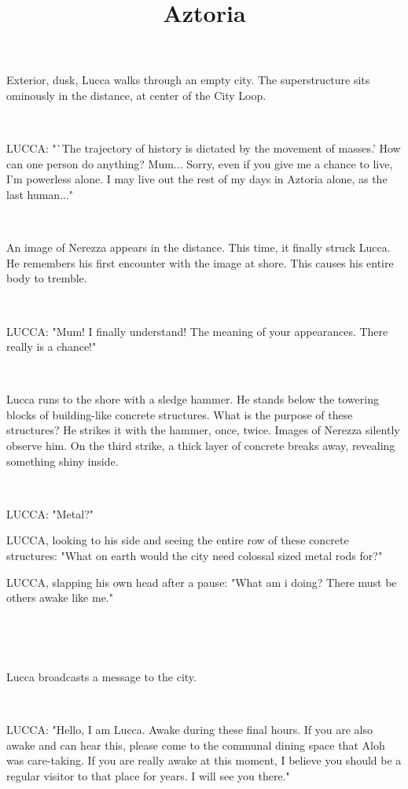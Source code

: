 \documentclass[11pt]{article}
\begin{document}
\ttfamily
\title{Aztoria}
\maketitle

Exterior, dusk, Lucca walks through an empty city.
The superstructure sits ominously in the distance, at center of the City Loop.

\ 

LUCCA: "`The trajectory of history is dictated by the movement of masses.' 
How can one person do anything?
Mum...
Sorry, even if you give me a chance to live, I'm powerless alone.
I may live out the rest of my days in Aztoria alone, as the last human..."

\ 

An image of Nerezza appears in the distance. 
This time, it finally struck Lucca.
He remembers his first encounter with the image at shore.
This causes his entire body to tremble.

\ 

LUCCA: "Mum! I finally understand! The meaning of your appearances. There really is a chance!"

\ 

Lucca runs to the shore with a sledge hammer. 
He stands below the towering blocks of building-like concrete structures.
What is the purpose of these structures?
He strikes it with the hammer, once, twice.
Images of Nerezza silently observe him.
On the third strike, a thick layer of concrete breaks away, revealing something shiny inside.

\ 

LUCCA: "Metal?"

LUCCA, looking to his side and seeing the entire row of these concrete structures: "What on earth would the city need colossal sized metal rods for?"

LUCCA, slapping his own head after a pause: "What am i doing? 
There must be others awake like me."

\ 

\ 

Lucca broadcasts a message to the city.

\ 

LUCCA: "Hello, I am Lucca. Awake during these final hours. 
If you are also awake and can hear this, please come to the communal dining space that Aloh was care-taking. 
If you are really awake at this moment, I believe you should be a regular visitor to that place for years.
I will see you there."
\end{document}
